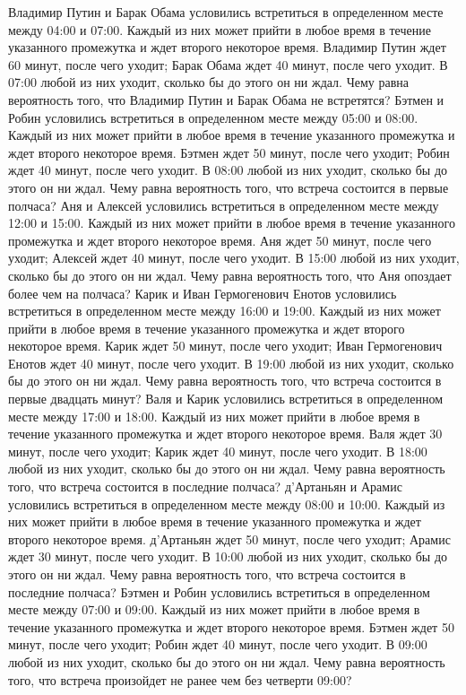 Владимир Путин и Барак Обама условились встретиться в определенном месте между 04:00 и 07:00. Каждый из них может прийти в любое время в течение указанного промежутка и ждет второго некоторое время. Владимир Путин ждет 60 минут, после чего уходит; Барак Обама ждет 40 минут, после чего уходит. В 07:00 любой из них уходит, сколько бы до этого он ни ждал. Чему равна вероятность того, что Владимир Путин и Барак Обама не встретятся?
Бэтмен и Робин условились встретиться в определенном месте между 05:00 и 08:00. Каждый из них может прийти в любое время в течение указанного промежутка и ждет второго некоторое время. Бэтмен ждет 50 минут, после чего уходит; Робин ждет 40 минут, после чего уходит. В 08:00 любой из них уходит, сколько бы до этого он ни ждал. Чему равна вероятность того, что встреча состоится в первые полчаса?
Аня и Алексей условились встретиться в определенном месте между 12:00 и 15:00. Каждый из них может прийти в любое время в течение указанного промежутка и ждет второго некоторое время. Аня ждет 50 минут, после чего уходит; Алексей ждет 40 минут, после чего уходит. В 15:00 любой из них уходит, сколько бы до этого он ни ждал. Чему равна вероятность того, что Аня опоздает более чем на полчаса?
Карик и Иван Гермогенович Енотов условились встретиться в определенном месте между 16:00 и 19:00. Каждый из них может прийти в любое время в течение указанного промежутка и ждет второго некоторое время. Карик ждет 50 минут, после чего уходит; Иван Гермогенович Енотов ждет 40 минут, после чего уходит. В 19:00 любой из них уходит, сколько бы до этого он ни ждал. Чему равна вероятность того, что встреча состоится в первые двадцать минут?
Валя и Карик условились встретиться в определенном месте между 17:00 и 18:00. Каждый из них может прийти в любое время в течение указанного промежутка и ждет второго некоторое время. Валя ждет 30 минут, после чего уходит; Карик ждет 40 минут, после чего уходит. В 18:00 любой из них уходит, сколько бы до этого он ни ждал. Чему равна вероятность того, что встреча состоится в последние полчаса?
д'Артаньян и Арамис условились встретиться в определенном месте между 08:00 и 10:00. Каждый из них может прийти в любое время в течение указанного промежутка и ждет второго некоторое время. д'Артаньян ждет 50 минут, после чего уходит; Арамис ждет 30 минут, после чего уходит. В 10:00 любой из них уходит, сколько бы до этого он ни ждал. Чему равна вероятность того, что встреча состоится в последние полчаса?
Бэтмен и Робин условились встретиться в определенном месте между 07:00 и 09:00. Каждый из них может прийти в любое время в течение указанного промежутка и ждет второго некоторое время. Бэтмен ждет 50 минут, после чего уходит; Робин ждет 40 минут, после чего уходит. В 09:00 любой из них уходит, сколько бы до этого он ни ждал. Чему равна вероятность того, что встреча произойдет не ранее чем без четверти 09:00?
